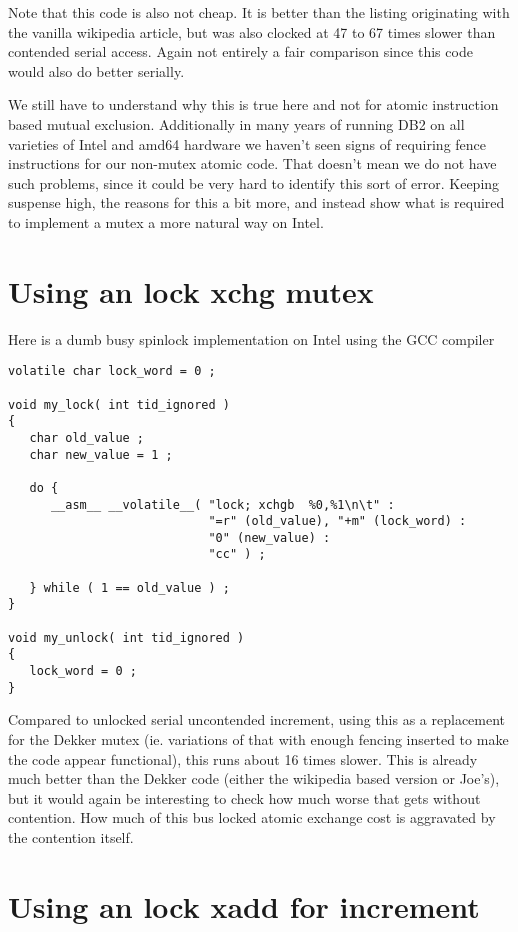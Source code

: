 Note that this code is also not cheap.  It is better than the listing originating with the vanilla wikipedia article, but was also clocked at 47 to 67 times slower than contended serial access.  Again not entirely a fair comparison since this code would also do better serially.

We still have to understand why this is true here and not for atomic instruction based mutual exclusion.  Additionally in many years of running DB2 on all varieties of Intel and amd64 hardware we haven't seen signs of requiring fence instructions for our non-mutex atomic code.  That doesn't mean we do not have such problems, since it could be very hard to identify this sort of error.  Keeping suspense high, the reasons for this a bit more, and instead show what is required to implement a mutex a more natural way on Intel.

\section{Using an lock xchg mutex}

Here is a dumb busy spinlock implementation on Intel using the GCC compiler

\begin{lstlisting}
volatile char lock_word = 0 ;

void my_lock( int tid_ignored )
{
   char old_value ;
   char new_value = 1 ;

   do {
      __asm__ __volatile__( "lock; xchgb  %0,%1\n\t" :
                            "=r" (old_value), "+m" (lock_word) :
                            "0" (new_value) :
                            "cc" ) ;

   } while ( 1 == old_value ) ;
}

void my_unlock( int tid_ignored )
{
   lock_word = 0 ;
}
\end{lstlisting}

Compared to unlocked serial uncontended increment, using this as a replacement for the Dekker mutex (ie. variations of that with enough fencing inserted to make the code appear functional), this runs about 16 times slower.  This is already much better than the Dekker code (either the wikipedia based version or Joe's), but it would again be interesting to check how much worse that gets without contention.  How much of this bus locked atomic exchange cost is aggravated by the contention itself.

\section{Using an lock xadd for increment}

